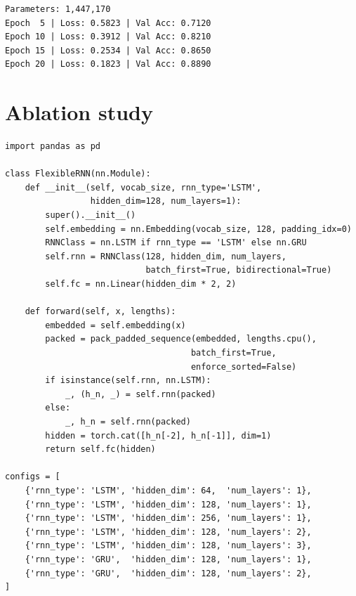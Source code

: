 \begin{codeoutput}
\begin{verbatim}
Parameters: 1,447,170
Epoch  5 | Loss: 0.5823 | Val Acc: 0.7120
Epoch 10 | Loss: 0.3912 | Val Acc: 0.8210
Epoch 15 | Loss: 0.2534 | Val Acc: 0.8650
Epoch 20 | Loss: 0.1823 | Val Acc: 0.8890
\end{verbatim}
\end{codeoutput}

\section{Ablation study}
\label{sec:rnn-ablation}

\begin{codeblock}[title=\textbf{Ablation: hidden size, layers, LSTM vs GRU}]
\begin{verbatim}
import pandas as pd

class FlexibleRNN(nn.Module):
    def __init__(self, vocab_size, rnn_type='LSTM',
                 hidden_dim=128, num_layers=1):
        super().__init__()
        self.embedding = nn.Embedding(vocab_size, 128, padding_idx=0)
        RNNClass = nn.LSTM if rnn_type == 'LSTM' else nn.GRU
        self.rnn = RNNClass(128, hidden_dim, num_layers,
                            batch_first=True, bidirectional=True)
        self.fc = nn.Linear(hidden_dim * 2, 2)

    def forward(self, x, lengths):
        embedded = self.embedding(x)
        packed = pack_padded_sequence(embedded, lengths.cpu(),
                                     batch_first=True,
                                     enforce_sorted=False)
        if isinstance(self.rnn, nn.LSTM):
            _, (h_n, _) = self.rnn(packed)
        else:
            _, h_n = self.rnn(packed)
        hidden = torch.cat([h_n[-2], h_n[-1]], dim=1)
        return self.fc(hidden)

configs = [
    {'rnn_type': 'LSTM', 'hidden_dim': 64,  'num_layers': 1},
    {'rnn_type': 'LSTM', 'hidden_dim': 128, 'num_layers': 1},
    {'rnn_type': 'LSTM', 'hidden_dim': 256, 'num_layers': 1},
    {'rnn_type': 'LSTM', 'hidden_dim': 128, 'num_layers': 2},
    {'rnn_type': 'LSTM', 'hidden_dim': 128, 'num_layers': 3},
    {'rnn_type': 'GRU',  'hidden_dim': 128, 'num_layers': 1},
    {'rnn_type': 'GRU',  'hidden_dim': 128, 'num_layers': 2},
]


\end{verbatim}
\end{codeblock}

